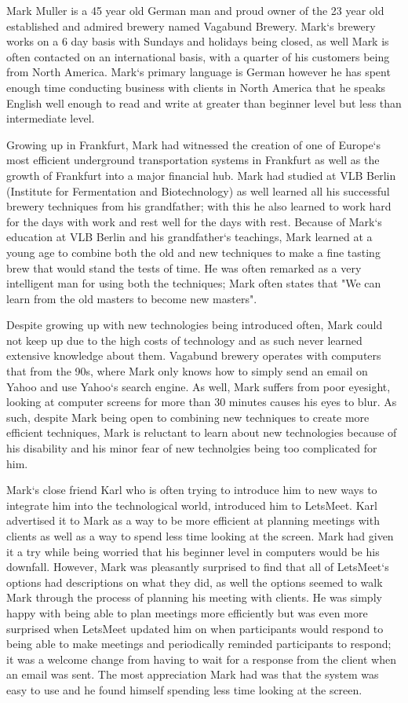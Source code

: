 \documentclass{sigchi}
\begin{document}
Mark Muller is a 45 year old German man and proud owner of the 23 year old established and admired brewery named Vagabund Brewery. Mark`s brewery works on a 6 day basis with Sundays and holidays being closed, as well Mark is often contacted on an international basis, with a quarter of his customers being from North America. Mark`s primary language is German however he has spent enough time conducting business with clients in North America that he speaks English well enough to read and write at greater than beginner level but less than intermediate level. 

Growing up in Frankfurt, Mark had witnessed the creation of one of Europe`s most efficient underground transportation systems in Frankfurt as well as the growth of Frankfurt into a major financial hub. Mark had studied at VLB Berlin (Institute for Fermentation and Biotechnology) as well learned all his successful brewery techniques from his grandfather; with this he also learned to work hard for the days with work and rest well for the days with rest. Because of Mark`s education at VLB Berlin and his grandfather`s teachings, Mark learned at a young age to combine both the old and new techniques to make a fine tasting brew that would stand the tests of time. He was often remarked as a very intelligent man for using both the techniques; Mark often states that "We can learn from the old masters to become new masters".

Despite growing up with new technologies being introduced often, Mark could not keep up due to the high costs of technology and as such never learned extensive knowledge about them. Vagabund brewery operates with computers that from the 90s, where Mark only knows how to simply send an email on Yahoo and use Yahoo`s search engine. As well, Mark suffers from poor eyesight, looking at computer screens for more than 30 minutes causes his eyes to blur. As such, despite Mark being open to combining new techniques to create more efficient techniques, Mark is reluctant to learn about new technologies because of his disability and his minor fear of new technolgies being too complicated for him.

Mark`s close friend Karl who is often trying to introduce him to new ways to integrate him into the technological world, introduced him to LetsMeet. Karl advertised it to Mark as a way to be more efficient at planning meetings with clients as well as a way to spend less time looking at the screen. Mark had given it a try while being worried that his beginner level in computers would be his downfall. However, Mark was pleasantly surprised to find that all of LetsMeet`s options had descriptions on what they did, as well the options seemed to walk Mark through the process of planning his meeting with clients. He was simply happy with being able to plan meetings more efficiently but was even more surprised when LetsMeet updated him on when participants would respond to being able to make meetings and periodically reminded participants to respond; it was a welcome change from having to wait for a response from the client when an email was sent. The most appreciation Mark had was that the system was easy to use and he found himself spending less time looking at the screen.
\end{document}
